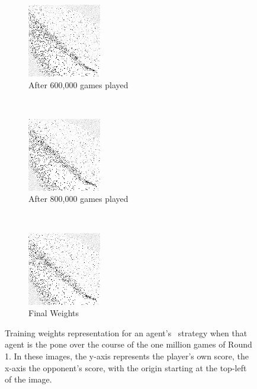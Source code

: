 \begin{figure}
	\begin{subfigure}[t]{0.2\textwidth}
	\includegraphics[width=\stratgraphwidth]{images/findings/round1/flipbook_d.png}
	\caption{After 600,000 games played}
	\end{subfigure}
	~
	\begin{subfigure}[t]{0.2\textwidth}
	\includegraphics[width=\stratgraphwidth]{images/findings/round1/flipbook_e.png}
	\caption{After 800,000 games played}
	\end{subfigure}
	~
	\begin{subfigure}[t]{0.2\textwidth}
	\includegraphics[width=\stratgraphwidth]{images/findings/round1/flipbook_f.png}
	\caption{Final Weights}
	\end{subfigure}

\caption{%
	Training weights representation for an agent's \handmaxavg\
	strategy when that agent is the pone
	over the course of the one million games of Round 1.
	In these images, the y-axis represents the player's own score,
	the x-axis the opponent's score,
	with the origin starting at the top-left of the image.
}
\label{fig_r1-flip}
\end{figure}

